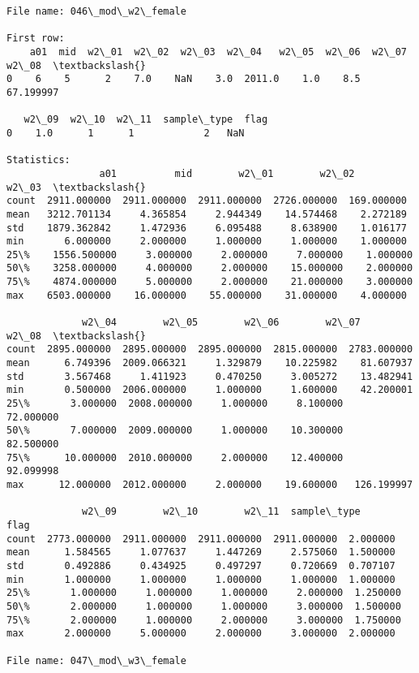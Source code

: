 \documentclass[11pt]{article}
\begin{document}
\begin{Verbatim}[commandchars=\\\{\}]
File name: 046\_mod\_w2\_female

First row: 
    a01  mid  w2\_01  w2\_02  w2\_03  w2\_04   w2\_05  w2\_06  w2\_07      w2\_08  \textbackslash{}
0    6    5      2    7.0    NaN    3.0  2011.0    1.0    8.5  67.199997   

   w2\_09  w2\_10  w2\_11  sample\_type  flag  
0    1.0      1      1            2   NaN  

Statistics: 
                a01          mid        w2\_01        w2\_02       w2\_03  \textbackslash{}
count  2911.000000  2911.000000  2911.000000  2726.000000  169.000000   
mean   3212.701134     4.365854     2.944349    14.574468    2.272189   
std    1879.362842     1.472936     6.095488     8.638900    1.016177   
min       6.000000     2.000000     1.000000     1.000000    1.000000   
25\%    1556.500000     3.000000     2.000000     7.000000    1.000000   
50\%    3258.000000     4.000000     2.000000    15.000000    2.000000   
75\%    4874.000000     5.000000     2.000000    21.000000    3.000000   
max    6503.000000    16.000000    55.000000    31.000000    4.000000   

             w2\_04        w2\_05        w2\_06        w2\_07        w2\_08  \textbackslash{}
count  2895.000000  2895.000000  2895.000000  2815.000000  2783.000000   
mean      6.749396  2009.066321     1.329879    10.225982    81.607937   
std       3.567468     1.411923     0.470250     3.005272    13.482941   
min       0.500000  2006.000000     1.000000     1.600000    42.200001   
25\%       3.000000  2008.000000     1.000000     8.100000    72.000000   
50\%       7.000000  2009.000000     1.000000    10.300000    82.500000   
75\%      10.000000  2010.000000     2.000000    12.400000    92.099998   
max      12.000000  2012.000000     2.000000    19.600000   126.199997   

             w2\_09        w2\_10        w2\_11  sample\_type      flag  
count  2773.000000  2911.000000  2911.000000  2911.000000  2.000000  
mean      1.584565     1.077637     1.447269     2.575060  1.500000  
std       0.492886     0.434925     0.497297     0.720669  0.707107  
min       1.000000     1.000000     1.000000     1.000000  1.000000  
25\%       1.000000     1.000000     1.000000     2.000000  1.250000  
50\%       2.000000     1.000000     1.000000     3.000000  1.500000  
75\%       2.000000     1.000000     2.000000     3.000000  1.750000  
max       2.000000     5.000000     2.000000     3.000000  2.000000  

File name: 047\_mod\_w3\_female


\end{Verbatim}
\end{document}
